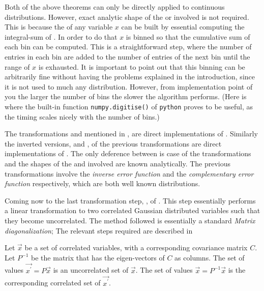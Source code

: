 Both of the above theorems can only be directly applied to continuous distributions.
However, exact analytic shape of the \pdfs or \cdfs involved is not required. This is because the \cdf
of any variable $x$ can be built by essential computing the integral-sum of . In order
to do that $x$ is binned so that the cumulative sum of each bin can be computed. This is a straightforward
step, where the number of entries in each bin are added to the number of entries of the next bin until the
range of $x$ is exhausted. It is important to point out that this binning can be arbitrarily fine without
having the problems explained in the introduction, since it is not used to much any distribution.
However, from implementation point of you the larger the number of bins the slower the algorithm performs.
(Here is where the built-in function {\tt numpy.digitise()} of {\tt python} proves to be useful, as the timing scales
nicely with the number of bins.)

The transformations \gFlat{} and \gGaus{} mentioned in , are direct implementations of
. Similarly the inverted versions, \gFlatInv{} and \gGausInv{},
of the previous transformations are direct implementations of .
The only deference between is case of the transformations \gGaus{} and \gGausInv{} the shapes
of the \pdf and \cdf involved are known analytically. The previous transformations involve the
{\it inverse error function} and the {\it complementary error function} respectively, which
are both well known distributions.

Coming now to the last transformation step, \gGausUn{}, of .
This step essentially performs a linear transformation to two correlated Gaussian distributed
variables such that they become uncorrelated. The method followed is essentially a standard
{\it Matrix diagonalization}; The relevant steps required are described in 

\begin{method}
 Let $\vec{x}$ be a set of correlated variables, with a corresponding covariance matrix $C$.
 Let $P^{-1}$ be the matrix that has the eigen-vectors of $C$ as columns.
 The set of values $\vec{x^\prime} = P\vec{x}$ is an uncorrelated set of $\vec{x}$.
 The set of values $\vec{x} = P^{-1}\vec{x}$ is the corresponding correlated set of $\vec{x^{\prime}}$.
 \label{meth_matrix_diag}
\end{method}

